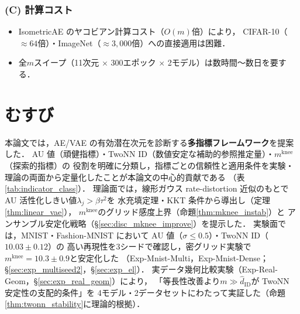 \documentclass[11pt,a4paper]{jsarticle}
\newcommand{\mknee}{m^{\mathrm{knee}}}
\begin{document}
\subsubsection*{(C) 計算コスト}

\begin{itemize}
  \item IsometricAE のヤコビアン計算コスト（$O(m)$倍）により，
        CIFAR-10（$\approx 64$倍）・ImageNet（$\approx 3{,}000$倍）への直接適用は困難．
  \item 全$m$スイープ（11次元 $\times$ 300エポック $\times$ 2モデル）は数時間〜数日を要する．
\end{itemize}

\section{むすび}\label{sec:conclusion}

本論文では，AE/VAE の有効潜在次元を診断する\textbf{多指標フレームワーク}を提案した．
AU 値（頑健指標）・TwoNN ID（数値安定な補助的参照推定量）・$\mknee$（探索的指標）の
役割を明確に分類し，指標ごとの信頼性と適用条件を実験・理論の両面から定量化したことが本論文の中心的貢献である
（表\ref{tab:indicator_class}）．
理論面では，線形ガウス rate-distortion 近似のもとで AU 活性化しきい値$\lambda_j > \beta\tau^2$を
水充填定理・KKT 条件から導出し（定理\ref{thm:linear_vae}），
$\mknee$のグリッド感度上界（命題\ref{thm:mknee_instab}）と
アンサンブル安定化戦略（§\ref{sec:disc_mknee_improve}）を提示した．
実験面では，MNIST・Fashion-MNIST において AU 値（$\sigma \leq 0.5$）・TwoNN ID（$10.03 \pm 0.12$）の
高い再現性を3シードで確認し，密グリッド実験で$\mknee = 10.3 \pm 0.9$と安定化した
（Exp-Mnist-Multi，Exp-Mnist-Dense；§\ref{sec:exp_multiseed2}，§\ref{sec:exp_el}）．
実データ幾何比較実験（Exp-Real-Geom，§\ref{sec:exp_real_geom}）により，
「等長性改善より$m \gg \hat{d}_\mathrm{ID}$が TwoNN 安定性の支配的条件」を
4モデル・2データセットにわたって実証した（命題\ref{thm:twonn_stability}に理論的根拠）．
\end{document}
